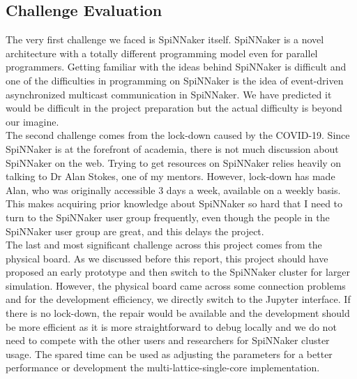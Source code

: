 \subsection{Challenge Evaluation}
The very first challenge we faced is SpiNNaker itself. SpiNNaker is a novel architecture with a totally different programming model even for parallel programmers. Getting familiar with the ideas behind SpiNNaker is difficult and one of the difficulties in programming on SpiNNaker is the idea of event-driven asynchronized multicast communication in SpiNNaker. We have predicted it would be difficult in the project preparation but the actual difficulty is beyond our imagine.\\

The second challenge comes from the lock-down caused by the COVID-19. Since SpiNNaker is at the forefront of academia, there is not much discussion about SpiNNaker on the web. Trying to get resources on SpiNNaker relies heavily on talking to Dr Alan Stokes, one of my mentors. However, lock-down has made Alan, who was originally accessible 3 days a week, available on a weekly basis. This makes acquiring prior knowledge about SpiNNaker so hard that I need to turn to the SpiNNaker user group frequently, even though the people in the SpiNNaker user group are great, and this delays the project. \\

The last and most significant challenge across this project comes from the physical board. As we discussed before this report, this project should have proposed an early prototype and then switch to the SpiNNaker cluster for larger simulation. However, the physical board came across some connection problems and for the development efficiency, we directly switch to the Jupyter interface. If there is no lock-down, the repair would be available and the development should be more efficient as it is more straightforward to debug locally and we do not need to compete with the other users and researchers for SpiNNaker cluster usage. The spared time can be used as adjusting the parameters for a better performance or development the multi-lattice-single-core implementation.





